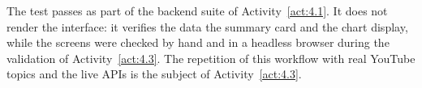 The test passes as part of the backend suite of Activity~\ref{act:4.1}. It does not render the interface: it verifies the data the summary card and the chart display, while the screens were checked by hand and in a headless browser during the validation of Activity~\ref{act:4.3}. The repetition of this workflow with real YouTube topics and the live APIs is the subject of Activity~\ref{act:4.3}.
